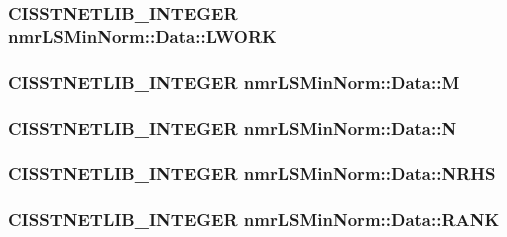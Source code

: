 \hypertarget{classnmr_l_s_min_norm_1_1_data_a50a5cd5f8089b150431899161b97aa2b}{
\subsubsection[{L\-W\-O\-R\-K}]{\setlength{\rightskip}{0pt plus 5cm}C\-I\-S\-S\-T\-N\-E\-T\-L\-I\-B\-\_\-\-I\-N\-T\-E\-G\-E\-R nmr\-L\-S\-Min\-Norm\-::\-Data\-::\-L\-W\-O\-R\-K}}\label{classnmr_l_s_min_norm_1_1_data_a50a5cd5f8089b150431899161b97aa2b}
\hypertarget{classnmr_l_s_min_norm_1_1_data_ac00bf9403b20ca5890370d3e788f288e}{
\subsubsection[{M}]{\setlength{\rightskip}{0pt plus 5cm}C\-I\-S\-S\-T\-N\-E\-T\-L\-I\-B\-\_\-\-I\-N\-T\-E\-G\-E\-R nmr\-L\-S\-Min\-Norm\-::\-Data\-::\-M}}\label{classnmr_l_s_min_norm_1_1_data_ac00bf9403b20ca5890370d3e788f288e}
\hypertarget{classnmr_l_s_min_norm_1_1_data_a840dbb98be27ad44c298d4c90eaadd1c}{
\subsubsection[{N}]{\setlength{\rightskip}{0pt plus 5cm}C\-I\-S\-S\-T\-N\-E\-T\-L\-I\-B\-\_\-\-I\-N\-T\-E\-G\-E\-R nmr\-L\-S\-Min\-Norm\-::\-Data\-::\-N}}\label{classnmr_l_s_min_norm_1_1_data_a840dbb98be27ad44c298d4c90eaadd1c}
\hypertarget{classnmr_l_s_min_norm_1_1_data_a506427633858fa8b619866cbdb4ce15c}{
\subsubsection[{N\-R\-H\-S}]{\setlength{\rightskip}{0pt plus 5cm}C\-I\-S\-S\-T\-N\-E\-T\-L\-I\-B\-\_\-\-I\-N\-T\-E\-G\-E\-R nmr\-L\-S\-Min\-Norm\-::\-Data\-::\-N\-R\-H\-S}}\label{classnmr_l_s_min_norm_1_1_data_a506427633858fa8b619866cbdb4ce15c}
\hypertarget{classnmr_l_s_min_norm_1_1_data_aac550ee0b64c1eeff7d6768fe59cd946}{
\subsubsection[{R\-A\-N\-K}]{\setlength{\rightskip}{0pt plus 5cm}C\-I\-S\-S\-T\-N\-E\-T\-L\-I\-B\-\_\-\-I\-N\-T\-E\-G\-E\-R nmr\-L\-S\-Min\-Norm\-::\-Data\-::\-R\-A\-N\-K}}\label{classnmr_l_s_min_norm_1_1_data_aac550ee0b64c1eeff7d6768fe59cd946}
